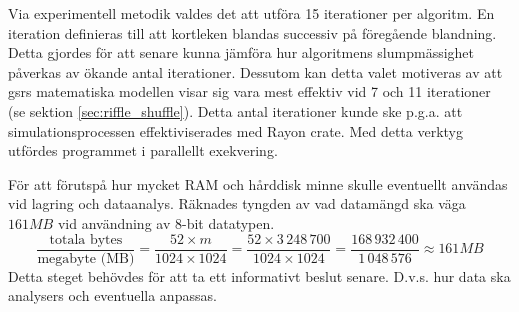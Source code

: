 \documentclass[swedish,a4paper]{article}
\begin{document}

Via experimentell metodik valdes det att utföra 15 iterationer
per algoritm. En iteration definieras till att kortleken blandas successiv på
föregående blandning. Detta gjordes 
för att senare kunna jämföra hur algoritmens slumpmässighet påverkas av ökande 
antal iterationer. Dessutom kan detta valet motiveras av att \gls{gsr}s matematiska
modellen visar sig vara mest effektiv vid 7 och 11 iterationer (se sektion
\ref{sec:riffle_shuffle}). Detta antal iterationer kunde
ske p.g.a. att simulationsprocessen effektiviserades med Rayon \gls{crate}.
Med detta verktyg utfördes programmet i parallellt exekvering. 

För att förutspå hur mycket RAM och hårddisk minne  skulle eventuellt användas vid
lagring och dataanalys. Räknades tyngden av vad datamängd ska väga 
$161 MB$ vid användning av 8-bit datatypen.
$$ \frac{\text{totala bytes}}{\text{megabyte (MB)}} = \frac{52 \times m }{1024 \times
1024} = \frac{52 \times 3\,248\,700}{1024 \times 1024} = \frac{168\,932\,400}{1\,048\,576} \approx 161 MB 
$$
Detta steget behövdes för att ta ett informativt beslut senare. D.v.s. hur data ska
analysers och eventuella anpassas.
\end{document}
